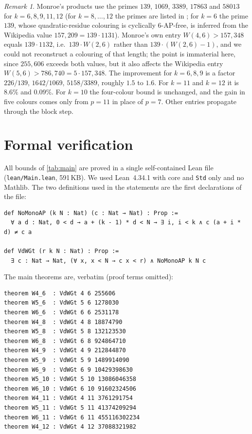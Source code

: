 \documentclass[11pt]{article}
\numberwithin{equation}{section}
\theoremstyle{definition}
\theoremstyle{remark}
\newtheorem{remark}[theorem]{Remark}
\newcommand{\W}{W}
\begin{document}
\begin{remark}
Monroe's products use the primes $139$, $1069$, $3389$, $17863$ and $58013$ for $k=6,8,9,11,12$
(for $k=8,\dots,12$ the primes are listed in \cite[Table~2]{Mon22,Mon25}; for $k=6$ the prime
$139$, whose quadratic-residue colouring is cyclically $6$-AP-free, is inferred from the
Wikipedia value $157{,}209=139\cdot1131$).  Monroe's own entry $\W(4,6)>157{,}348$ equals
$139\cdot1132$, i.e.\ $139\cdot\W(2,6)$ rather than $139\cdot(\W(2,6)-1)$, and we could not
reconstruct a colouring of that length; the point is immaterial here, since $255{,}606$ exceeds
both values, but it also affects the Wikipedia entry $\W(5,6)>786{,}740=5\cdot157{,}348$.
The improvement for $k=6,8,9$ is a factor $226/139$, $1642/1069$, $5158/3389$, roughly $1.5$
to $1.6$.  For $k=11$ and $k=12$ it is $8.6\%$ and $0.09\%$.  For $k=10$ the four-colour bound
is unchanged, and the gain in five colours comes only from $p=11$ in place of $p=7$.  Other
entries propagate through the block step.
\end{remark}

\section{Formal verification}\label{sec:lean}

All bounds of \cref{tab:main} are proved in a single self-contained Lean file
(\texttt{lean/Main.lean}, 591\,KB).  We used Lean~4.34.1 with core and \texttt{Std} only and no
Mathlib.  The two definitions used in the statements are the first declarations of the file:

\begin{lstlisting}
def NoMonoAP (k N : Nat) (c : Nat → Nat) : Prop :=
  ∀ a d : Nat, 0 < d → a + (k - 1) * d < N → ∃ i, i < k ∧ c (a + i * d) ≠ c a

def VdWGt (r k N : Nat) : Prop :=
  ∃ c : Nat → Nat, (∀ x, x < N → c x < r) ∧ NoMonoAP k N c
\end{lstlisting}

The main theorems are, verbatim (proof terms omitted):

\begin{lstlisting}
theorem W4_6  : VdWGt 4 6 255606
theorem W5_6  : VdWGt 5 6 1278030
theorem W6_6  : VdWGt 6 6 2531178
theorem W4_8  : VdWGt 4 8 18874790
theorem W5_8  : VdWGt 5 8 132123530
theorem W6_8  : VdWGt 6 8 924864710
theorem W4_9  : VdWGt 4 9 212844870
theorem W5_9  : VdWGt 5 9 1489914090
theorem W6_9  : VdWGt 6 9 10429398630
theorem W5_10 : VdWGt 5 10 13086046358
theorem W6_10 : VdWGt 6 10 91602324506
theorem W4_11 : VdWGt 4 11 3761291754
theorem W5_11 : VdWGt 5 11 41374209294
theorem W6_11 : VdWGt 6 11 455116302234
theorem W4_12 : VdWGt 4 12 37088321982
\end{lstlisting}
\end{document}
